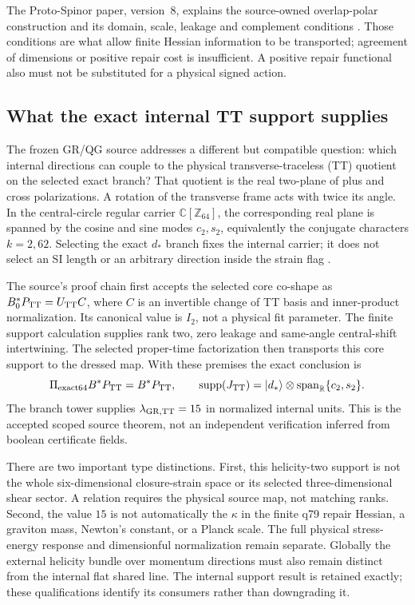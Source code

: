 \documentclass[11pt]{article}
\begin{document}
The Proto-Spinor paper, version~8, explains the source-owned overlap-polar
construction and its domain, scale, leakage and complement conditions
\cite{ProtoSpinorCurrent}. Those conditions are what allow finite Hessian
information to be transported; agreement of dimensions or positive repair
cost is insufficient. A positive repair functional also must not be
substituted for a physical signed action.

\subsection{What the exact internal TT support supplies}
\label{sec:gr-tt-support}
The frozen GR/QG source addresses a different but compatible question: which
internal directions can couple to the physical transverse-traceless (TT)
quotient on the selected exact branch? That quotient is the real two-plane
of plus and cross polarizations. A rotation of the transverse frame acts
with twice its angle. In the central-circle regular carrier
$\mathbb C[\mathbb Z_{64}]$, the corresponding real plane is spanned by the
cosine and sine modes $c_2,s_2$, equivalently the conjugate characters
$k=2,62$. Selecting the exact $d_*$ branch fixes the internal carrier; it
does not select an SI length or an arbitrary direction inside the strain
flag \cite{FrozenTT}.

The source's proof chain first accepts the selected core co-shape as
$B_0^*P_{\rm TT}=U_{\rm TT}C$, where $C$ is an invertible change of TT
basis and inner-product normalization. Its canonical value is $I_2$, not a
physical fit parameter. The finite support calculation supplies rank two,
zero leakage and same-angle central-shift intertwining. The selected
proper-time factorization then transports this core support to the dressed
map. With these premises the exact conclusion is
\[
 \Pi_{\rm exact64}B^*P_{\rm TT}=B^*P_{\rm TT},\qquad
 \operatorname{supp}(J_{\rm TT})
 =|d_*\rangle\otimes\operatorname{span}_{\mathbb R}\{c_2,s_2\}.
\]
The branch tower supplies $\lambda_{{\rm GR},{\rm TT}}=15$ in normalized
internal units. This is the accepted scoped source theorem, not an
independent verification inferred from boolean certificate fields.

There are two important type distinctions. First, this helicity-two support
is not the whole six-dimensional closure-strain space or its selected
three-dimensional shear sector. A relation requires the physical source map,
not matching ranks. Second, the value $15$ is not automatically the $\kappa$
in the finite q79 repair Hessian, a graviton mass, Newton's constant, or a
Planck scale. The full physical stress-energy response and dimensionful
normalization remain separate. Globally the external helicity bundle over
momentum directions must also remain distinct from the internal flat shared
line. The internal support result is retained exactly; these qualifications
identify its consumers rather than downgrading it.
\end{document}
